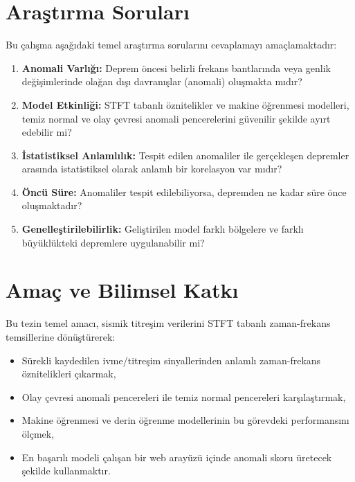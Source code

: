 \section{Araştırma Soruları}

Bu çalışma aşağıdaki temel araştırma sorularını cevaplamayı amaçlamaktadır:

\begin{enumerate}
    \item \textbf{Anomali Varlığı:} Deprem öncesi belirli frekans bantlarında veya genlik değişimlerinde olağan dışı davranışlar (anomali) oluşmakta mıdır?
    
    \item \textbf{Model Etkinliği:} STFT tabanlı öznitelikler ve makine öğrenmesi modelleri, temiz normal ve olay çevresi anomali pencerelerini güvenilir şekilde ayırt edebilir mi?
    
    \item \textbf{İstatistiksel Anlamlılık:} Tespit edilen anomaliler ile gerçekleşen depremler arasında istatistiksel olarak anlamlı bir korelasyon var mıdır?
    
    \item \textbf{Öncü Süre:} Anomaliler tespit edilebiliyorsa, depremden ne kadar süre önce oluşmaktadır?
    
    \item \textbf{Genelleştirilebilirlik:} Geliştirilen model farklı bölgelere ve farklı büyüklükteki depremlere uygulanabilir mi?
\end{enumerate}

\section{Amaç ve Bilimsel Katkı}

Bu tezin temel amacı, sismik titreşim verilerini STFT tabanlı zaman-frekans temsillerine dönüştürerek:

\begin{itemize}
    \item Sürekli kaydedilen ivme/titreşim sinyallerinden anlamlı zaman-frekans öznitelikleri çıkarmak,
    \item Olay çevresi anomali pencereleri ile temiz normal pencereleri karşılaştırmak,
    \item Makine öğrenmesi ve derin öğrenme modellerinin bu görevdeki performansını ölçmek,
    \item En başarılı modeli çalışan bir web arayüzü içinde anomali skoru üretecek şekilde kullanmaktır.
\end{itemize}

